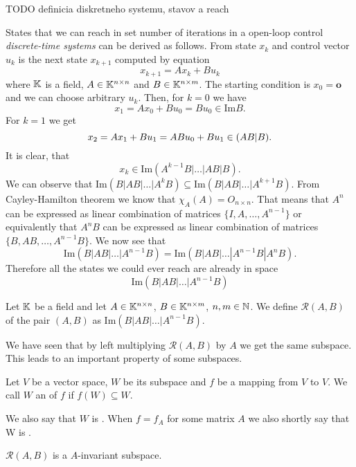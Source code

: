 TODO definicia diskretneho systemu, stavov a reach

\begin{definition}
	
\end{definition}

States that we can reach in set number of iterations in a open-loop control \textit{discrete-time systems} can be derived as follows. From state $x_k$ and control vector $u_k$ is the next state $x_{k+1}$ computed by equation $$x_{k+1}=Ax_k+Bu_k$$ where $\mathbb{K}$ is a field, $A\in\mathbb{K}^{n\times n}$ and $B\in\mathbb{K}^{n\times m}$. The starting condition is $x_0=\textbf{o}$ and we can choose arbitrary $u_k$. Then, for $k=0$ we have $$x_1=Ax_0+Bu_0=Bu_0 \in \text{Im}B.$$ For $k=1$ we get $$x_2=Ax_1+Bu_1=ABu_0+Bu_1\in\text(AB|B).$$ It is clear, that $$x_k\in\text{Im}(A^{k-1}B|\ldots|AB|B).$$ We can observe that $\text{Im}(B|AB|\ldots|A^kB) \subseteq \text{Im}(B|AB|\ldots|A^{k+1}B)$. From Cayley-Hamilton theorem we know that $\chi_A(A)=O_{n\times n}$. That means that $A^n$ can be expressed as linear combination of matrices $\{I,A,\ldots,A^{n-1}\}$ or equivalently that $A^nB$ can be expressed as linear combination of matrices $\{B,AB,\ldots,A^{n-1}B\}$. We now see that $$\text{Im}(B|AB|\ldots|A^{n-1}B)=\text{Im}(B|AB|\ldots|A^{n-1}B|A^nB).$$ Therefore all the states we could ever reach are already in space $$\text{Im}(B|AB|\ldots|A^{n-1}B)$$

\begin{definition}
	Let $\mathbb{K}$ be a field and let $A \in \mathbb{K}^{n \times n}$, $B \in \mathbb{K}^{n \times m}$, $n,m \in \mathbb{N}$. We define  $\mathcal{R}(A,B)$ of the pair $(A,B)$ as $\text{Im}(B|AB|\ldots|A^{n-1}B)$.
\end{definition}

We have seen that by left multiplying $\mathcal{R}(A,B)$ by $A$ we get the same subspace. This leads to an important property of some subspaces.

\begin{definition}
	Let $V$ be a vector space, $W$ be its subspace and $f$ be a mapping from $V$ to $V$. We call $W$ an  of $f$ if $f(W)\subseteq W$.

	We also say that $W$ is . When $f=f_A$ for some matrix $A$ we also shortly say that W is .
\end{definition}

\begin{remark}
	\label{rem:reachinv}
	$\mathcal{R}(A,B)$ is a $A$-invariant subspace.
\end{remark} 

